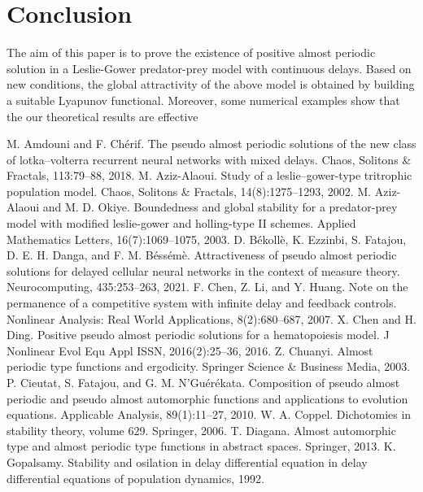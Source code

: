 \documentclass[[a4paper,10pt]{article}
\begin{document}
\section{Conclusion} The aim of this paper is to prove the existence of positive almost periodic solution in a Leslie-Gower predator-prey model with continuous delays. Based
on new conditions, the global attractivity of the above model is obtained by
building a suitable Lyapunov functional. Moreover, some numerical examples show  that  the our theoretical results are effective

\begin{thebibliography}{23}
 M. Amdouni and F. Chérif. The pseudo almost periodic solutions of the new class of lotka–volterra recurrent neural networks with mixed delays. Chaos, Solitons \& Fractals, 113:79–88,
2018.
 M. Aziz-Alaoui. Study of a leslie–gower-type tritrophic population model. Chaos, Solitons \& Fractals, 14(8):1275–1293, 2002.
 M. Aziz-Alaoui and M. D. Okiye. Boundedness and global stability for a predator-prey model with modified leslie-gower and holling-type II schemes. Applied Mathematics Letters,
16(7):1069–1075, 2003.
 D. Békollè, K. Ezzinbi, S. Fatajou, D. E. H. Danga, and F. M. Béssémè. Attractiveness of pseudo almost periodic solutions for delayed cellular neural networks in the context of measure theory. Neurocomputing, 435:253–263, 2021.
 F. Chen, Z. Li, and Y. Huang. Note on the permanence of a competitive system with infinite
delay and feedback controls. Nonlinear Analysis: Real World Applications, 8(2):680–687, 2007.
 X. Chen and H. Ding. Positive pseudo almost periodic solutions for a hematopoiesis model. J Nonlinear Evol Equ Appl ISSN, 2016(2):25–36, 2016.
Z. Chuanyi. Almost periodic type functions and ergodicity. Springer Science \& Business Media, 2003.
 P. Cieutat, S. Fatajou, and G. M. N’Guérékata. Composition of pseudo almost periodic and pseudo almost automorphic functions and applications to evolution equations. Applicable Analysis, 89(1):11–27, 2010.
 W. A. Coppel. Dichotomies in stability theory, volume 629. Springer, 2006.
 T. Diagana. Almost automorphic type and almost periodic type functions in abstract spaces. Springer, 2013.
 K. Gopalsamy. Stability and osilation in delay differential equation in delay differential equations of population dynamics, 1992.

\end{thebibliography}
\end{document}
